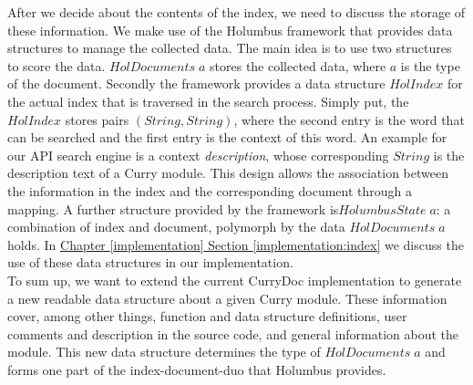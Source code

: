 \documentclass[%
	pdftex,%
	a4paper,%
	oneside,%
	chapterprefix,%
	headsepline,%
	12pt%
]{scrbook}
\newcommand{\Conid}[1]{\mathit{#1}}
\newcommand{\Varid}[1]{\mathit{#1}}
\begin{document}
After we decide about the contents of the index, we need to discuss
the storage of these information. We make use of the Holumbus
framework that provides data structures to manage the collected
data. The main idea is to use two structures to score the data.
\ensuremath{\Conid{HolDocuments}\;\Varid{a}} stores the collected data, where \ensuremath{\Varid{a}} is the type of
the document. Secondly the framework provides a data structure
\ensuremath{\Conid{HolIndex}} for the actual index that is traversed in the search
process. Simply put, the \ensuremath{\Conid{HolIndex}} stores pairs \ensuremath{(\Conid{String},\Conid{String})},
where the second entry is the word that can be searched and the first
entry is the context of this word. An example for our API search
engine is a context \emph{description}, whose corresponding \ensuremath{\Conid{String}}
is the description text of a Curry module. This design allows the
association between the information in the index and the corresponding
document through a mapping. A further structure provided by the
framework is\ensuremath{\Conid{HolumbusState}\;\Varid{a}}: a combination of index and document,
polymorph by the data \ensuremath{\Conid{HolDocuments}\;\Varid{a}} holds. In
\hyperref[implementation:index]{Chapter \ref{implementation} Section
  \ref{implementation:index}} we discuss the use of these data
structures in our implementation.\\

To sum up, we want to extend the current CurryDoc implementation to
generate a new readable data structure about a given Curry
module. These information cover, among other things, function and data
structure definitions, user comments and description in the source
code, and general information about the module. This new data
structure determines the type of \ensuremath{\Conid{HolDocuments}\;\Varid{a}} and forms one part
of the index-document-duo that Holumbus provides. 
\end{document}

